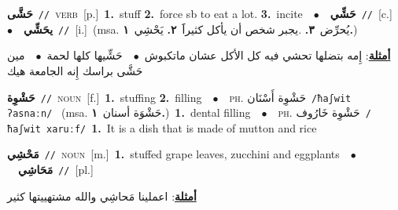\documentclass[10pt,a4paper,twoside]{article} %
\begin{document}
\begin{multicols}{2}
{\setlength\topsep{0pt}\textbf{\foreignlanguage{arabic}{حَشَّى}}\ {\color{gray}\texttt{//}\color{black}}\ \textsc{verb}\ [p.]\ \textbf{1.}~stuff  \textbf{2.}~force sb to eat a lot.  \textbf{3.}~incite\ \ $\bullet$\ \ \setlength\topsep{0pt}\textbf{\foreignlanguage{arabic}{حَشِّي}}\ {\color{gray}\texttt{//}\color{black}}\ [c.]\ \ $\bullet$\ \ \setlength\topsep{0pt}\textbf{\foreignlanguage{arabic}{يحَشِّي}}\ {\color{gray}\texttt{//}\color{black}}\ [i.]\ \color{gray}(msa. \foreignlanguage{arabic}{يُحرِّض}~\foreignlanguage{arabic}{\textbf{٣.}}  .\foreignlanguage{arabic}{يجبر شخص أن يأكل كثيراََ}~\foreignlanguage{arabic}{\textbf{٢.}}  \foreignlanguage{arabic}{يَحْشِي}~\foreignlanguage{arabic}{\textbf{١.}})\color{black}\  \begin{flushright}\color{gray}\foreignlanguage{arabic}{\textbf{\underline{\foreignlanguage{arabic}{أمثلة}}}: إِمه بتضلها تحشي فيه كل الأكل عشان ماتكبوش\ $\bullet$\ \  حَشِّيها كلها لحمة\ $\bullet$\ \  مين حَشَّى براسك إِنه الجامعة هيك}\end{flushright}\color{black}} \vspace{2mm}

{\setlength\topsep{0pt}\textbf{\foreignlanguage{arabic}{حَشْوِة}}\ {\color{gray}\texttt{//}\color{black}}\ \textsc{noun}\ [f.]\ \textbf{1.}~stuffing  \textbf{2.}~filling\ \ $\bullet$\ \ \textsc{ph.} \color{gray} \foreignlanguage{arabic}{حَشْوِة أَسْنَان}\color{black}\ {\color{gray}\texttt{/{\sffamily ħaʃwit ʔasnaːn}/}\color{black}}\ \color{gray} (msa. \foreignlanguage{arabic}{حَشْوَة أسنان}~\foreignlanguage{arabic}{\textbf{١.}})\color{black}\ \textbf{1.}~dental filling\ \ $\bullet$\ \ \textsc{ph.} \color{gray} \foreignlanguage{arabic}{حَشْوِة خَارُوف}\color{black}\ {\color{gray}\texttt{/{\sffamily ħaʃwit xaruːf}/}\color{black}}\ \textbf{1.}~It is a dish that is made of mutton and rice\ } \vspace{2mm}

{\setlength\topsep{0pt}\textbf{\foreignlanguage{arabic}{مَحْشِي}}\ {\color{gray}\texttt{//}\color{black}}\ \textsc{noun}\ [m.]\ \textbf{1.}~stuffed grape leaves, zucchini and eggplants\ \ $\bullet$\ \ \setlength\topsep{0pt}\textbf{\foreignlanguage{arabic}{مَحَاشِي}}\ {\color{gray}\texttt{//}\color{black}}\ [pl.]\  \begin{flushright}\color{gray}\foreignlanguage{arabic}{\textbf{\underline{\foreignlanguage{arabic}{أمثلة}}}: اعملينا مَحاشِي والله مشتهييتها كثير}\end{flushright}\color{black}} \vspace{2mm}


\end{multicols}
\end{document}
